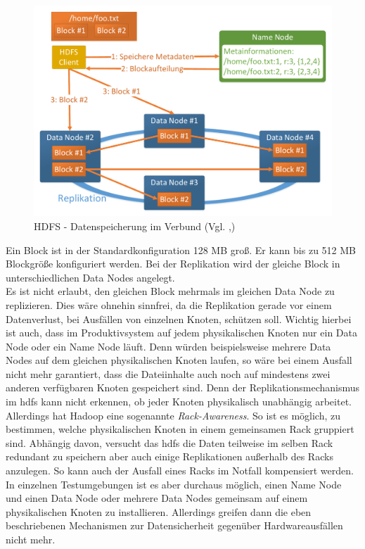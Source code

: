 \begin{figure}[ht]
  \centering
  \includegraphics[width=\textwidth]{./resource/hdfs_cluster_architecture.pdf}
  \caption{HDFS - Datenspeicherung im Verbund (Vgl. \cite{hdfs_architecture},\cite{expert_hadoop_admin})}
  \label{fig:hdfs_cluster_architecture}
\end{figure}

\noindent
Ein Block ist in der Standardkonfiguration 128 MB groß. Er kann bis zu 512 MB Blockgröße konfiguriert werden. Bei der Replikation wird der gleiche Block in unterschiedlichen Data Nodes angelegt.\\
Es ist nicht erlaubt, den gleichen Block mehrmals im gleichen Data Node zu replizieren. Dies wäre ohnehin sinnfrei, da die Replikation gerade vor einem Datenverlust, bei Ausfällen von einzelnen Knoten, schützen soll. Wichtig hierbei ist auch, dass im Produktivsystem auf jedem physikalischen Knoten nur ein Data Node oder ein Name Node läuft. Denn würden beispielsweise mehrere Data Nodes auf dem gleichen physikalischen Knoten laufen, so wäre bei einem Ausfall nicht mehr garantiert, dass die Dateiinhalte auch noch auf mindestens zwei anderen verfügbaren Knoten gespeichert sind.
Denn der Replikationsmechanismus im \gls{hdfs} kann nicht erkennen, ob jeder Knoten physikalisch unabhängig arbeitet. Allerdings hat Hadoop eine sogenannte \textit{Rack-Awareness}. So ist es möglich, zu bestimmen, welche physikalischen Knoten in einem gemeinsamen Rack gruppiert sind. Abhängig davon, versucht das \gls{hdfs} die Daten teilweise im selben Rack redundant zu speichern aber auch einige Replikationen außerhalb des Racks anzulegen. So kann auch der Ausfall eines Racks im Notfall kompensiert werden.\\
In einzelnen Testumgebungen ist es aber durchaus möglich, einen Name Node und einen Data Node oder mehrere Data Nodes gemeinsam auf einem physikalischen Knoten zu installieren. Allerdings greifen dann die eben beschriebenen Mechanismen zur Datensicherheit gegenüber Hardwareausfällen nicht mehr.\\

